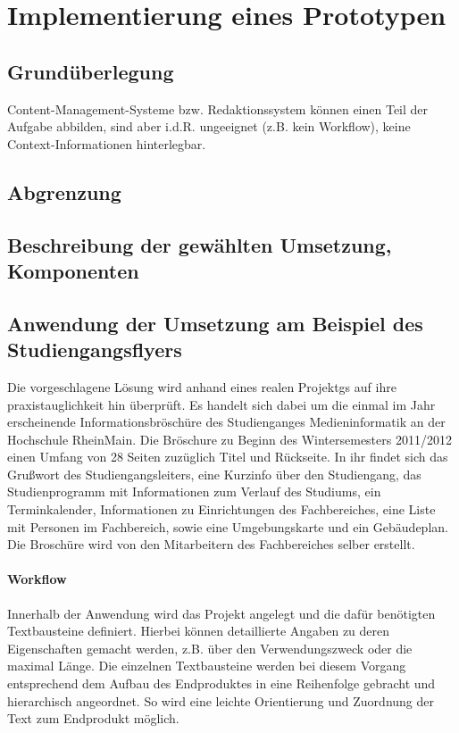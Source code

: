 \section{Implementierung eines Prototypen}\label{l:implementierung}

\subsection{Grundüberlegung}

Content-Management-Systeme bzw. Redaktionssystem können einen Teil der Aufgabe abbilden, sind aber i.d.R. ungeeignet (z.B. kein Workflow), keine Context-Informationen hinterlegbar.

\subsection{Abgrenzung}
\subsection{Beschreibung der gewählten Umsetzung, Komponenten}

\subsection{Anwendung der Umsetzung am Beispiel des Studiengangsflyers}

Die vorgeschlagene Lösung wird anhand eines realen Projektgs auf ihre praxistauglichkeit hin überprüft. Es handelt sich dabei um die einmal im Jahr erscheinende Informationsbröschüre des Studienganges Medieninformatik an der Hochschule RheinMain. Die Bröschure zu Beginn des Wintersemesters 2011/2012 einen Umfang von 28 Seiten zuzüglich Titel und Rückseite. In ihr findet sich das Grußwort des Studiengangsleiters, eine Kurzinfo über den Studiengang, das Studienprogramm mit Informationen zum Verlauf des Studiums, ein Terminkalender, Informationen zu Einrichtungen des Fachbereiches, eine Liste mit Personen im Fachbereich, sowie eine Umgebungskarte und ein Gebäudeplan. Die Broschüre wird von den Mitarbeitern des Fachbereiches selber erstellt.

\paragraph{Workflow}

Innerhalb der Anwendung wird das Projekt angelegt und die dafür benötigten Textbausteine definiert. Hierbei können detaillierte Angaben zu deren Eigenschaften gemacht werden, z.B. über den Verwendungszweck oder die maximal Länge. Die einzelnen Textbausteine werden bei diesem Vorgang entsprechend dem Aufbau des Endproduktes in eine Reihenfolge gebracht und hierarchisch angeordnet. So wird eine leichte Orientierung und Zuordnung der Text zum Endprodukt möglich. 

